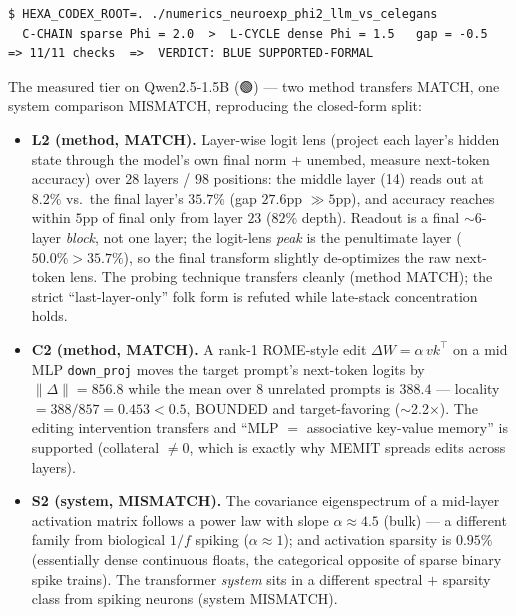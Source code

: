 \documentclass[11pt,a4paper]{article}
\providecommand{\tierGreen}{🟢}
\begin{document}
\begin{lstlisting}[basicstyle=\ttfamily\scriptsize,frame=single,xleftmargin=0pt]
$ HEXA_CODEX_ROOT=. ./numerics_neuroexp_phi2_llm_vs_celegans
  C-CHAIN sparse Phi = 2.0  >  L-CYCLE dense Phi = 1.5   gap = -0.5
=> 11/11 checks  =>  VERDICT: BLUE SUPPORTED-FORMAL
\end{lstlisting}

The measured tier on Qwen2.5-1.5B ($\tierGreen$) --- two method
transfers MATCH, one system comparison MISMATCH, reproducing the
closed-form split:

\begin{itemize}\itemsep0.3em
\item \textbf{L2 (method, MATCH).} Layer-wise logit lens (project each
  layer's hidden state through the model's own final norm + unembed,
  measure next-token accuracy) over $28$ layers / $98$ positions: the
  middle layer (14) reads out at $8.2\%$ vs.\ the final layer's $35.7\%$
  (gap $27.6$pp $\gg 5$pp), and accuracy reaches within $5$pp of final
  only from layer $23$ ($82\%$ depth). Readout is a final $\sim$6-layer
  \emph{block}, not one layer; the logit-lens \emph{peak} is the
  penultimate layer ($50.0\%>35.7\%$), so the final transform slightly
  de-optimizes the raw next-token lens. The probing technique transfers
  cleanly (method MATCH); the strict ``last-layer-only'' folk form is
  refuted while late-stack concentration holds.
\item \textbf{C2 (method, MATCH).} A rank-1 ROME-style edit
  $\Delta W=\alpha\,v k^{\!\top}$ on a mid MLP \texttt{down\_proj} moves
  the target prompt's next-token logits by $\lVert\Delta\rVert=856.8$
  while the mean over $8$ unrelated prompts is $388.4$ ---
  locality $=388/857=0.453<0.5$, BOUNDED and target-favoring
  ($\sim$2.2$\times$). The editing intervention transfers and
  ``MLP $=$ associative key-value memory'' is supported (collateral
  $\ne 0$, which is exactly why MEMIT spreads edits across layers).
\item \textbf{S2 (system, MISMATCH).} The covariance eigenspectrum of a
  mid-layer activation matrix follows a power law with slope
  $\alpha\!\approx\!4.5$ (bulk) --- a different family from biological
  $1/f$ spiking ($\alpha\!\approx\!1$); and activation sparsity is
  $0.95\%$ (essentially dense continuous floats, the categorical
  opposite of sparse binary spike trains). The transformer
  \emph{system} sits in a different spectral $+$ sparsity class from
  spiking neurons (system MISMATCH).
\end{itemize}
\end{document}
